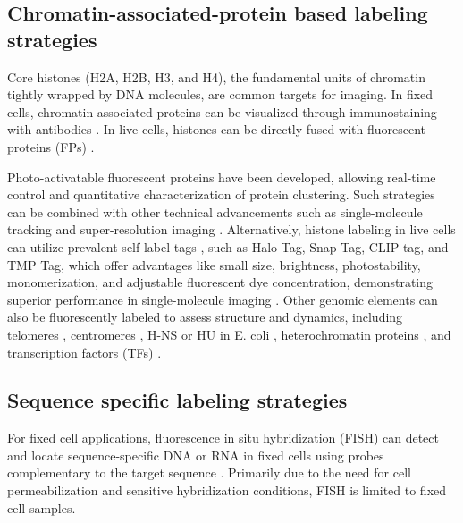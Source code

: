 \subsection{Chromatin-associated-protein based labeling strategies}

Core histones (H2A, H2B, H3, and H4), the fundamental units of chromatin tightly wrapped by DNA molecules, are common targets for imaging. In fixed cells, chromatin-associated proteins can be visualized through immunostaining with antibodies \parencite{Conic2018,Ricci2015,Xu2018}. In live cells, histones can be directly fused with fluorescent proteins (FPs) \parencite{Belmont2001,Das2003,Kanda1998}.

Photo-activatable fluorescent proteins have been developed, allowing real-time control and quantitative characterization of protein clustering. Such strategies can be combined with other technical advancements such as single-molecule tracking and super-resolution imaging \parencite{Cisse2013,Manley2008,Nozaki2017}. Alternatively, histone labeling in live cells can utilize prevalent self-label tags \parencite{Liss2015,Stagge2013}, such as Halo Tag, Snap Tag, CLIP tag, and TMP Tag, which offer advantages like small size, brightness, photostability, monomerization, and adjustable fluorescent dye concentration, demonstrating superior performance in single-molecule imaging \parencite{Grimm2017,Nagashima2019,Nozaki2017}. Other genomic elements can also be fluorescently labeled to assess structure and dynamics, including telomeres \parencite{Avogaro2018}, centromeres \parencite{Avogaro2018,Gasser2002}, H-NS or HU in E. coli \parencite{Wang2011}, heterochromatin proteins \parencite{Hu2013}, and transcription factors (TFs) \parencite{Elf2007,Gebhardt2013}.

\subsection{Sequence specific labeling strategies}

For fixed cell applications, fluorescence in situ hybridization (FISH) can detect and locate sequence-specific DNA or RNA in fixed cells using probes complementary to the target sequence \parencite{Bayani2004,Beliveau2015}. Primarily due to the need for cell permeabilization and sensitive hybridization conditions, FISH is limited to fixed cell samples.

